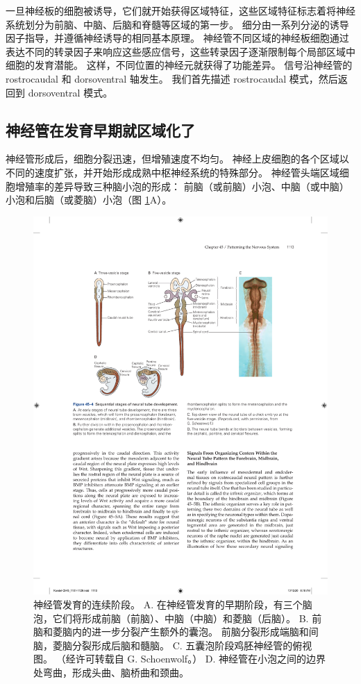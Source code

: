 一旦神经板的细胞被诱导，它们就开始获得区域特征，这些区域特征标志着将神经系统划分为前脑、中脑、后脑和脊髓等区域的第一步。
细分由一系列分泌的诱导因子指导，并遵循神经诱导的相同基本原理。
神经管不同区域的神经板细胞通过表达不同的转录因子来响应这些感应信号，这些转录因子逐渐限制每个局部区域中细胞的发育潜能。
这样，不同位置的神经元就获得了功能差异。
信号沿神经管的 rostrocaudal 和 dorsoventral 轴发生。
我们首先描述 rostrocaudal 模式，然后返回到 dorsoventral 模式。



\subsection{神经管在发育早期就区域化了}

神经管形成后，细胞分裂迅速，但增殖速度不均匀。
神经上皮细胞的各个区域以不同的速度扩张，并开始形成成熟中枢神经系统的特殊部分。
神经管头端区域细胞增殖率的差异导致三种脑小泡的形成：
前脑（或前脑）小泡、中脑（或中脑）小泡和后脑（或菱脑）小泡（图 \ref{fig:45_4}A）。


\begin{figure}[htbp]
	\centering
	\includegraphics[width=0.8\linewidth]{chap45/fig_45_4}
	\caption{神经管发育的连续阶段。 A. 在神经管发育的早期阶段，有三个脑泡，它们将形成前脑（前脑）、中脑（中脑）和菱脑（后脑）。 B. 前脑和菱脑内的进一步分裂产生额外的囊泡。 前脑分裂形成端脑和间脑，菱脑分裂形成后脑和髓脑。 C. 五囊泡阶段鸡胚神经管的俯视图。 （经许可转载自 G. Schoenwolf。） D. 神经管在小泡之间的边界处弯曲，形成头曲、脑桥曲和颈曲。}
	\label{fig:45_4}
\end{figure}


